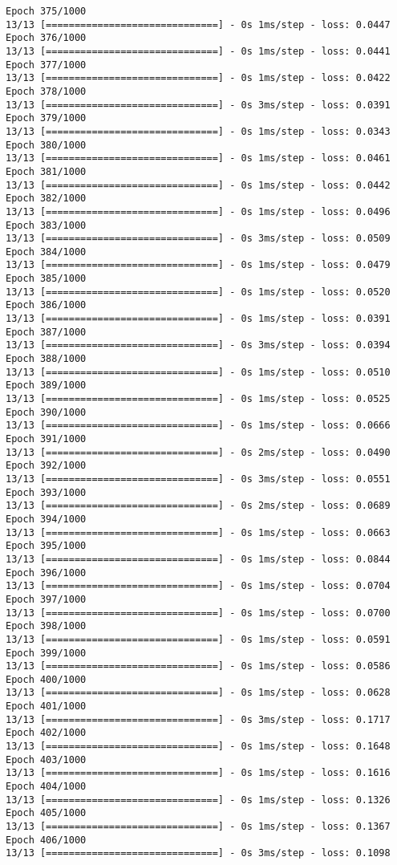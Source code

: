 \documentclass[11pt]{article}
\begin{document}
\begin{Verbatim}[commandchars=\\\{\}]
Epoch 375/1000
13/13 [==============================] - 0s 1ms/step - loss: 0.0447
Epoch 376/1000
13/13 [==============================] - 0s 1ms/step - loss: 0.0441
Epoch 377/1000
13/13 [==============================] - 0s 1ms/step - loss: 0.0422
Epoch 378/1000
13/13 [==============================] - 0s 3ms/step - loss: 0.0391
Epoch 379/1000
13/13 [==============================] - 0s 1ms/step - loss: 0.0343
Epoch 380/1000
13/13 [==============================] - 0s 1ms/step - loss: 0.0461
Epoch 381/1000
13/13 [==============================] - 0s 1ms/step - loss: 0.0442
Epoch 382/1000
13/13 [==============================] - 0s 1ms/step - loss: 0.0496
Epoch 383/1000
13/13 [==============================] - 0s 3ms/step - loss: 0.0509
Epoch 384/1000
13/13 [==============================] - 0s 1ms/step - loss: 0.0479
Epoch 385/1000
13/13 [==============================] - 0s 1ms/step - loss: 0.0520
Epoch 386/1000
13/13 [==============================] - 0s 1ms/step - loss: 0.0391
Epoch 387/1000
13/13 [==============================] - 0s 3ms/step - loss: 0.0394
Epoch 388/1000
13/13 [==============================] - 0s 1ms/step - loss: 0.0510
Epoch 389/1000
13/13 [==============================] - 0s 1ms/step - loss: 0.0525
Epoch 390/1000
13/13 [==============================] - 0s 1ms/step - loss: 0.0666
Epoch 391/1000
13/13 [==============================] - 0s 2ms/step - loss: 0.0490
Epoch 392/1000
13/13 [==============================] - 0s 3ms/step - loss: 0.0551
Epoch 393/1000
13/13 [==============================] - 0s 2ms/step - loss: 0.0689
Epoch 394/1000
13/13 [==============================] - 0s 1ms/step - loss: 0.0663
Epoch 395/1000
13/13 [==============================] - 0s 1ms/step - loss: 0.0844
Epoch 396/1000
13/13 [==============================] - 0s 1ms/step - loss: 0.0704
Epoch 397/1000
13/13 [==============================] - 0s 1ms/step - loss: 0.0700
Epoch 398/1000
13/13 [==============================] - 0s 1ms/step - loss: 0.0591
Epoch 399/1000
13/13 [==============================] - 0s 1ms/step - loss: 0.0586
Epoch 400/1000
13/13 [==============================] - 0s 1ms/step - loss: 0.0628
Epoch 401/1000
13/13 [==============================] - 0s 3ms/step - loss: 0.1717
Epoch 402/1000
13/13 [==============================] - 0s 1ms/step - loss: 0.1648
Epoch 403/1000
13/13 [==============================] - 0s 1ms/step - loss: 0.1616
Epoch 404/1000
13/13 [==============================] - 0s 1ms/step - loss: 0.1326
Epoch 405/1000
13/13 [==============================] - 0s 1ms/step - loss: 0.1367
Epoch 406/1000
13/13 [==============================] - 0s 3ms/step - loss: 0.1098

\end{Verbatim}
\end{document}
